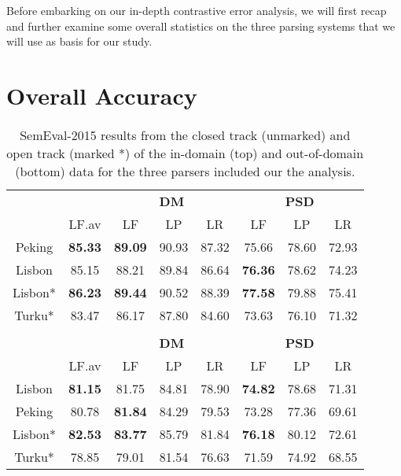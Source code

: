 Before embarking on our in-depth contrastive error analysis, we will first recap and further examine some overall statistics on the three parsing systems that we will use as basis for our study.

\section{Overall Accuracy}

\begin{table}
    \centering
    \begin{tabular}{@{}cccccccc@{}}
        \toprule
        \multicolumn{1}{c}{ }
        & \multicolumn{1}{c}{ }
        & \multicolumn{3}{c}{\textbf{DM}}
        & \multicolumn{3}{c}{\textbf{PSD}} \\
        \cmidrule(lr){3-5}
        \cmidrule(lr){6-8}
        &
        LF.av &
        LF & LP & LR &
        LF & LP & LR \\
        \midrule
        Peking & \textbf{85.33} & \textbf{89.09} & 90.93 & 87.32 &   75.66 & 78.60 & 72.93 \\
        Lisbon & 85.15          & 88.21 & 89.84 & 86.64 &            \textbf{76.36} & 78.62 & 74.23 \\
        \midrule
        Lisbon* & \textbf{86.23}& \textbf{89.44} & 90.52 & 88.39 &   \textbf{77.58} & 79.88 & 75.41 \\
        Turku* & 83.47          & 86.17 & 87.80 & 84.60 &            73.63 & 76.10 & 71.32 \\
        \bottomrule
        
        \\
        \toprule
        \multicolumn{1}{c}{ }
        & \multicolumn{1}{c}{ }
        & \multicolumn{3}{c}{\textbf{DM}}
        & \multicolumn{3}{c}{\textbf{PSD}} \\
        \cmidrule(lr){3-5}
        \cmidrule(lr){6-8}
        &
        LF.av &
        LF & LP & LR &
        LF & LP & LR \\
        \midrule
        Lisbon & \textbf{81.15} &   81.75 & 84.81 & 78.90 &             \textbf{74.82} & 78.68 & 71.31 \\
        Peking & 80.78 &            \textbf{81.84} & 84.29 & 79.53 &    73.28 & 77.36 & 69.61 \\
        \midrule
        Lisbon* & \textbf{82.53} &           \textbf{83.77} & 85.79 & 81.84 &    \textbf{76.18} & 80.12 & 72.61 \\
        Turku* & 78.85 &            79.01 & 81.54 & 76.63 & 71.59 &     74.92 & 68.55 \\
        \bottomrule
    \end{tabular}
    \caption{SemEval-2015 results from the closed track (unmarked) and open track (marked *) of the in-domain (top) and out-of-domain (bottom) data for the three parsers included our the analysis.}
    \label{fig:data:recap}
\end{table}


